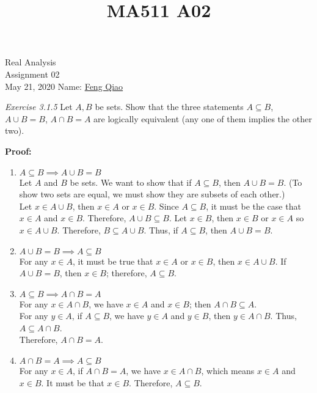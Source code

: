 \documentclass[12pt]{article}
\title{MA511 A02}
\begin{document}
\begin{flushleft}
{\sc \Large Real Analysis} \\ 
\medskip
Assignment 02\\
May 21, 2020
\hfill Name: \underline{Feng Qiao} \\

\setdefaultleftmargin{0pt}{}{}{}{}{}

\textit{Exercise 3.1.5} Let \(A,B\) be sets. Show that the three statements \(A\subseteq B\), \(A \cup B = B\), \(A \cap B = A\) are logically equivalent (any one of them implies the other two).

\textbf{Proof:}
\renewcommand{\labelenumi}{\alph{enumi})}
\begin{enumerate}
    \item \(A \subseteq B \implies A \cup B = B\) \\
    Let \(A\) and $B$ be sets. %
    We want to show that if \(A\subseteq B\), then \(A\cup B=B\).  (To show two sets are equal, we must show they are subsets of each other.)\\
    Let \(x\in A\cup B\), then \(x\in A\) or \(x\in B\).  Since \(A\subseteq B\), it must be the case that \(x\in A\) and \(x\in B\).  Therefore, \(A\cup B\subseteq B\).
    Let \(x\in B\), then \(x\in B\) or \(x\in A\) so \(x\in A\cup B\).  Therefore, \(B\subseteq A\cup B\).  Thus, if \(A\subseteq B\), then \(A\cup B=B\).

    \item \( A \cup B = B \implies  A \subseteq B\) \\
    For any \(x \in A\), it must be true that \(x \in A \) or \(x \in B\), then \(x \in A \cup B\). If \(A \cup B = B\), then \(x \in B\); therefore, \(A \subseteq B\).

    \item \(A \subseteq B \implies A \cap B =A\)\\
    For any \(x \in A \cap B\), we have \(x \in A\) and \(x \in B\); then \(A \cap B \subseteq A\).\\
    For any \(y \in A\), if \(A \subseteq B\), we have \(y \in A \) and \(y \in B\), then \(y \in A \cap B\). Thus, \(A \subseteq A \cap B\).\\
    Therefore, \(A \cap B = A\).

    \item \(A \cap B =A \implies  A \subseteq B\)\\
    For any \(x \in A\), if \(A \cap B =A\), we have \(x \in A \cap B\), which means \(x \in A\) and \(x \in B\). It must be that \(x \in B\). Therefore, \(A \subseteq B\).


\end{enumerate}
\end{flushleft}
\end{document}
